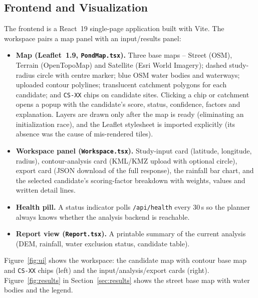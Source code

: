 \documentclass[manuscript,screen,review]{acmart}
\begin{document}
\subsection{Frontend and Visualization}
The frontend is a React~19 single-page application built with Vite. The
workspace pairs a map panel with an input/results panel:

\begin{itemize}
  \item \textbf{Map (Leaflet~1.9, \texttt{PondMap.tsx}).} Three base maps --
  Street (OSM), Terrain (OpenTopoMap) and Satellite (Esri World Imagery);
  dashed study-radius circle with centre marker; blue OSM water bodies and
  waterways; uploaded contour polylines; translucent catchment polygons for
  each candidate; and \texttt{CS-XX} chips on candidate sites. Clicking a
  chip or catchment opens a popup with the candidate's score, status,
  confidence, factors and explanation. Layers are drawn only after the map
  is ready (eliminating an initialization race), and the Leaflet stylesheet
  is imported explicitly (its absence was the cause of mis-rendered tiles).
  \item \textbf{Workspace panel (\texttt{Workspace.tsx}).} Study-input card
  (latitude, longitude, radius), contour-analysis card (KML/KMZ upload with
  optional circle), export card (JSON download of the full response), the
  rainfall bar chart, and the selected candidate's scoring-factor breakdown
  with weights, values and written detail lines.
  \item \textbf{Health pill.} A status indicator polls
  \texttt{/api/health} every 30\,s so the planner always knows whether the
  analysis backend is reachable.
  \item \textbf{Report view (\texttt{Report.tsx}).} A printable summary of
  the current analysis (DEM, rainfall, water exclusion status, candidate
  table).
\end{itemize}

Figure~\ref{fig:ui} shows the workspace: the candidate map with contour base
map and \texttt{CS-XX} chips (left) and the input/analysis/export cards
(right). Figure~\ref{fig:results} in Section~\ref{sec:results} shows the
street base map with water bodies and the legend.
\end{document}
